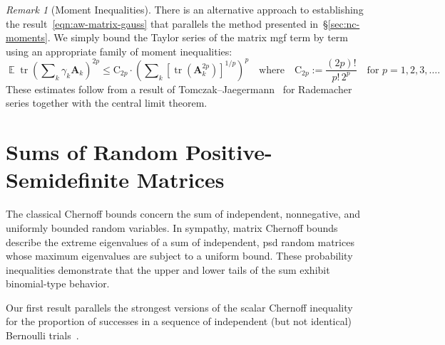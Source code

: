 \documentclass[11pt,letterpaper,twoside,reqno,draft]{amsart}
\theoremstyle{remark}
\newtheorem{rem}[thm]{Remark}
\numberwithin{equation}{section}
\numberwithin{thm}{section}
\begin{document}
\begin{rem}[Moment Inequalities]
There is an alternative approach to establishing the result~\eqref{eqn:aw-matrix-gauss} that parallels the method presented in~\S\ref{sec:nc-moments}.  We simply bound the Taylor series of the matrix mgf term by term using an appropriate family of moment inequalities:
$$
{\operatorname{\mathbb{E}}} {\operatorname{tr}} \left( \sum\nolimits_k \gamma_k {\bm{{A}}}_k \right)^{2p}
	\leq {\mathrm{{C}}}_{2p} \cdot \left( \sum\nolimits_k \left[ {\operatorname{tr}}({\bm{{A}}}_k^{2p}) \right]^{1/p} \right)^p
\quad\text{where}\quad
{\mathrm{{C}}}_{2p} := \frac{(2p)!}{p! \, 2^p}
\quad\text{for $p = 1, 2, 3, \dots$.}
$$
These estimates follow from a result of Tomczak--Jaegermann~\cite[Thm.~3.1]{TJ74:Moduli-Smoothness} for Rademacher series together with the central limit theorem.
\end{rem}

\section{Sums of Random Positive-Semidefinite Matrices} \label{sec:chernoff}

The classical Chernoff bounds concern the sum of independent, nonnegative, and uniformly bounded random variables.  In sympathy, matrix Chernoff bounds describe the extreme eigenvalues of a sum of independent, psd random matrices whose maximum eigenvalues are subject to a uniform bound.  These probability inequalities demonstrate that the upper and lower tails of the sum exhibit binomial-type behavior.

Our first result parallels the strongest versions of the scalar Chernoff inequality for the proportion of successes in a sequence of independent (but not identical) Bernoulli trials~\cite[Exer.~7]{Lug09:Concentration-Measure}. 
\end{document}
